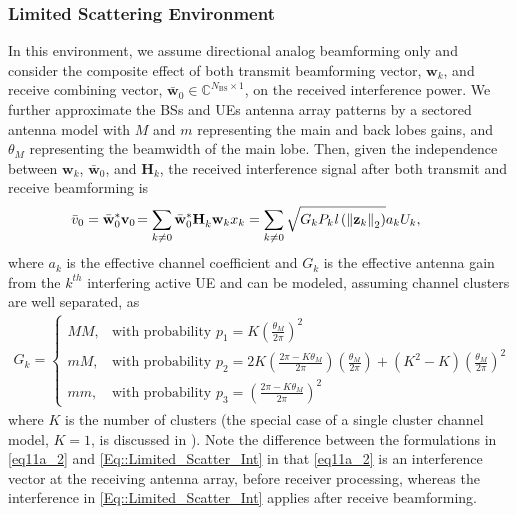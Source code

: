 \documentclass[12pt, draftclsnofoot, onecolumn]{IEEEtran}
\theoremstyle{plain}
\begin{document}
\subsubsection{Limited Scattering Environment}
In this environment, we assume directional analog beamforming only and consider the composite effect of both transmit beamforming vector, $\textbf{w}_{k}$, and receive combining vector, $\bar{\textbf{w}}_{0} \in \mathbb{C}^{N_{\text{BS}}\times 1}$, on the received interference power. We further approximate the BSs and UEs antenna array patterns by a sectored antenna model with $M$ and $m$ representing the main and back lobes gains, and $\theta_M$ representing the beamwidth of the main lobe. Then, given the independence between $\textbf{w}_{k}$, $\bar{\textbf{w}}_{0}$, and ${\mathbf{{H}}_{k}^{}}$, the received interference signal after both transmit and receive beamforming is
\begin{align}
\!\!\!\!\!\!\bar{v}_0 = \bar{\textbf{w}}_{0}^{\ast} \textbf{v}_{0}&\!=\sum\limits_{k\neq 0} \bar{\textbf{w}}_{0}^{\ast} {\mathbf{{H}}_{k}^{}} \textbf{w}_{k} x_{k} = \sum\limits_{k\neq 0} \sqrt{G_k P_k \mathit{l}\left({\Vert \bold{z}_k \Vert}_2\right)} a_k  U_k,\label{Eq::Limited_Scatter_Int}
\end{align}
where $a_k$ is the effective channel coefficient and $G_k$ is the effective antenna gain from the $k^{th}$ interfering active UE and can be modeled, assuming channel clusters are well separated, as \newpage
\begin{align}
G_k = \begin{cases} 
MM, & \mbox{with probability } p_1 = K(\frac{\theta_M}{2\pi})^2 \\ 
mM, & \mbox{with probability } p_2 = 2K(\frac{2\pi-K\theta_M}{2\pi})(\frac{\theta_M}{2\pi}) + (K^2-K)(\frac{\theta_M}{2\pi})^2 \\
mm, & \mbox{with probability } p_3 = (\frac{2\pi-K\theta_M}{2\pi})^2
\end{cases}
\end{align}
where $K$ is the number of clusters (the special case of a single cluster channel model, $K=1$, is discussed in \cite{BaiH14,turgut2016coverage}). Note the difference between the formulations in \eqref{eq11a_2} and \eqref{Eq::Limited_Scatter_Int} in that \eqref{eq11a_2} is an interference vector at the receiving antenna array, before receiver processing, whereas the interference in \eqref{Eq::Limited_Scatter_Int} applies after receive beamforming. 
%
\end{document}
